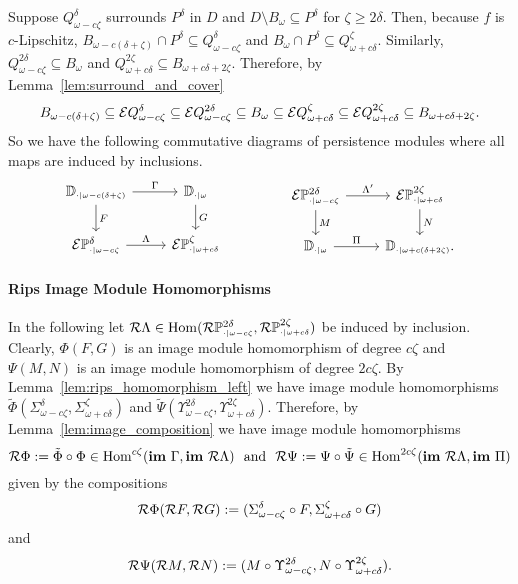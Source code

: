 
Suppose $Q_{\omega-c\zeta}^\delta$ surrounds $P^\delta$ in $D$ and $D\setminus B_\omega\subseteq P^\delta$ for $\zeta\geq 2\delta$.
Then, because $f$ is $c$-Lipschitz, $B_{\omega-c(\delta+\zeta)}\cap P^\delta\subseteq Q_{\omega-c\zeta}^\delta$ and $B_\omega\cap P^\delta\subseteq Q_{\omega+c\delta}^\zeta$.
Similarly, $Q_{\omega-c\zeta}^{2\delta}\subseteq B_\omega$ and $Q_{\omega+c\delta}^{2\zeta}\subseteq B_{\omega+c{\delta+2\zeta}}$.
Therefore, by Lemma~\ref{lem:surround_and_cover}
\[ B_{\omega-c(\delta+\zeta)}\subseteq \mathcal{E} Q_{\omega-c\zeta}^\delta\subseteq\mathcal{E} Q_{\omega-c\zeta}^{2\delta}\subseteq B_\omega
  \subseteq \mathcal{E} Q_{\omega+c\delta}^\zeta\subseteq \mathcal{E} Q_{\omega+c\delta}^{2\zeta}\subseteq B_{\omega+c{\delta+2\zeta}}.\]
%
So we have the following commutative diagrams of persistence modules where all maps are induced by inclusions.
\[\begin{tikzcd}
    \DD{\omega-c(\delta+\zeta)} \arrow{r}{\Gamma}\arrow{d}{F} &
    \DD{\omega} \arrow{d}{G}\\
    \E\PP{\omega-c\zeta}{\delta}\arrow{r}{\Lambda} &
    \E\PP{\omega+c\delta}{\zeta}
  \end{tikzcd}\hspace{10ex}
  \begin{tikzcd}
    \E\PP{\omega-c\zeta}{2\delta} \arrow{r}{\Lambda'}\arrow{d}{M} &
    \E\PP{\omega+c\delta}{2\zeta}\arrow{d}{N}\\
    \DD{\omega} \arrow{r}{\Pi} &
    \DD{\omega+c(\delta+2\zeta)}.
  \end{tikzcd}\]

\paragraph{Rips Image Module Homomorphisms}

In the following let $\mathcal{R}\Lambda\in\mathrm{Hom}(\mathcal{R}\mathbb{P}_{\scriptscriptstyle \cdot\mid \omega-c\zeta}^{2\delta},\mathcal{R}\mathbb{P}_{\scriptscriptstyle \cdot\mid \omega+c\delta}^{2\zeta})$ be induced by inclusion.
Clearly, $\Phi(F, G)$ is an image module homomorphism of degree $c\zeta$ and $\Psi(M, N)$ is an image module homomorphism of degree $2c\zeta$.
By Lemma~\ref{lem:rips_homomorphism_left} we have image module homomorphisms $\tilde{\Phi}(\Sigma_{\omega-c\zeta}^\delta, \Sigma_{\omega+c\delta}^\zeta)$ and $\tilde{\Psi}(\Upsilon_{\omega-c\zeta}^{2\delta}, \Upsilon_{\omega+c\delta}^{2\zeta})$.
Therefore, by Lemma~\ref{lem:image_composition} we have image module homomorphisms
\[ \mathcal{R}\Phi := \tilde{\Phi}\circ\Phi\in\mathrm{Hom}^{c\zeta}(\mathbf{im}~\Gamma,\mathbf{im}~\mathcal{R}\Lambda)\ \text{ and }\ \mathcal{R}\Psi :=\Psi\circ\tilde{\Psi}\in\mathrm{Hom}^{2c\zeta}(\mathbf{im}~\mathcal{R}\Lambda, \mathbf{im}~\Pi)\] given by the compositions
\[ \mathcal{R}\Phi(\mathcal{R} F, \mathcal{R} G) := (\Sigma_{\omega-c\zeta}^\delta\circ F, \Sigma_{\omega+c\delta}^\zeta\circ G)\]
and
\[ \mathcal{R}\Psi(\mathcal{R} M, \mathcal{R} N) := (M\circ \Upsilon_{\omega-c\zeta}^{2\delta}, N\circ\Upsilon_{\omega+c\delta}^{2\zeta}).\]


